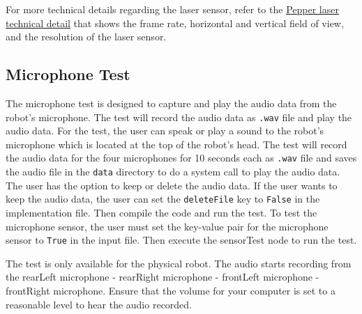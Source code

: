 \documentclass{CSSRforAfrica}
\begin{document}
For more technical details regarding the laser sensor, refer to the \href{http://doc.aldebaran.com/2-5/family/pepper_technical/laser_pep.html#d-laser-pepper}{Pepper laser technical detail} that shows 
the frame rate, horizontal and vertical field of view, and the resolution of the laser sensor.

\subsection{Microphone Test}
The microphone test is designed to capture and play the audio data from the robot's microphone. The test will record the audio data as \texttt{.wav} file and play the audio data. 
For the test, the user can speak or play a sound to the robot's microphone which is located at the top of the robot's head. The test will record the audio data for the four microphones for 10
seconds each as \texttt{.wav} file and saves the audio file in the \texttt{data} directory to do a system call to play the audio data. The user has the option to keep or delete the audio data. If the user wants to keep the audio data, the user can set the \texttt{deleteFile} key to \texttt{False} in the implementation file. 
Then compile the code and run the test. To test the microphone sensor, the user must set the key-value pair for the microphone sensor to \texttt{True} in the input file. 
Then execute the sensorTest node to run the test.

\vspace{0.5cm}

\begingroup
{}
\begin{tcolorbox}[nobeforeafter,
	enhanced,
	sharp corners,
	toprule=1pt,
	bottomrule=1pt,
	leftrule=0pt,
	rightrule=0pt,
	colback=yellow!20,
	left skip=\mynote@shift,
	right skip=\mynote@shift,
	overlay={\node[left] (mynotenode) at ([xshift=-\mynote@shift]frame.west) {\textbf{\textcolor{greenyellow}{Note:}}} ;},]
	The test is only available for the physical robot. The audio starts recording from the rearLeft microphone - rearRight microphone - frontLeft microphone - frontRight microphone.
	Ensure that the volume for your computer is set to a reasonable level to hear the audio recorded.
\end{tcolorbox}
\endgroup
\end{document}
